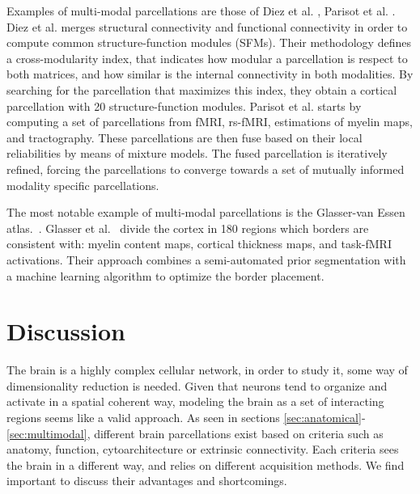 Examples of multi-modal parcellations are those of Diez et al. \cite{Diez2014},
Parisot et al. \cite{Parisot2017}. 
Diez et al. \cite{Diez2014} merges structural connectivity and functional
connectivity in order to compute common structure-function modules (SFMs).
Their methodology defines a cross-modularity index, that indicates how
modular a parcellation is respect to both matrices, and how similar is the
internal connectivity in both modalities. By searching for the parcellation
that maximizes this index, they obtain a cortical parcellation with 20 structure-function
modules. Parisot et al. \cite{Parisot2017} starts by computing a set of
parcellations from fMRI, rs-fMRI, estimations of myelin maps, and tractography.
These parcellations are then fuse based on their local reliabilities by means of
mixture models. The fused parcellation is iteratively refined, forcing 
the parcellations to converge towards a set of mutually informed modality specific
parcellations.

The most notable example of multi-modal parcellations is the
Glasser-van Essen atlas.~\cite{Glasser2016}. Glasser et al.~\cite{Glasser2016}
divide the cortex in 180 regions which borders are consistent with: 
myelin content maps, cortical thickness maps, and task-fMRI activations. Their
approach combines a semi-automated prior segmentation with a machine learning
algorithm to optimize the border placement.

\section{Discussion}

The brain is a highly complex cellular network, in order to study it, some
way of dimensionality reduction is needed. Given that neurons tend to organize
and activate in a spatial coherent way, modeling the brain as a set of interacting
regions seems like a valid approach. As seen in sections \ref{sec:anatomical}-\ref{sec:multimodal},
different brain parcellations exist based on criteria such as anatomy, function,
cytoarchitecture or extrinsic connectivity. Each criteria sees the brain in
a different way, and relies on different acquisition methods. We find important
to discuss their advantages and shortcomings.

